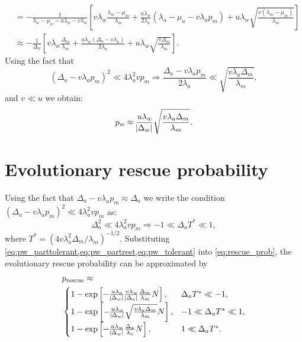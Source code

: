 \documentclass[12pt]{extarticle}
\newcommand{\presc}{p_\text{rescue}}
\begin{document}
\begin{appendices}
\begin{equation}
\begin{aligned}
&=-\frac{1}{\lambda_w-\mu_w-u\lambda_w-v\lambda_w}\left[v\lambda_w\frac{\lambda_m-\mu_m}{\lambda_m}+\frac{u\lambda_w}{2\lambda_a}\left(\lambda_a-\mu_a-v\lambda_ap_m\right)+u\lambda_w\sqrt{\frac{v\left(\lambda_m-\mu_m\right)}{\lambda_m}}\right]\\
&\approx-\frac{1}{\Delta_w}\left[v\lambda_w\frac{\Delta_m}{\lambda_m}+\frac{u\lambda_w\left(\Delta_a-v\lambda_a\right)}{2\lambda_a}+u\lambda_w\sqrt{\frac{v\Delta_m}{\lambda_m}}\right].
\end{aligned}
\end{equation}
Using the fact that
\begin{equation*}
\left(\Delta_a-v\lambda_ap_m\right)^2 \ll 4\lambda_a^2vp_m\Rightarrow\frac{\Delta_a-v\lambda_ap_m}{2\lambda_a} \ll \sqrt{\frac{v\lambda_a\Delta_m}{\lambda_m}},
\end{equation*}
and $v\ll u$ we obtain:
\begin{equation}\label{eq:pw_partrest}
p_w\approx\frac{u\lambda_w}{\abs{\Delta_w}} \sqrt{\frac{v\lambda_a\Delta_m}{\lambda_m}}.
\end{equation}

\section{Evolutionary rescue probability}\label{sec:appendix-rescue-prob}
Using the fact that $\Delta_a-v\lambda_ap_m\approx\Delta_a$ we write the condition $\left(\Delta_a-v\lambda_ap_m\right)^2 \ll 4\lambda_a^2vp_m$ as:
\begin{equation*}
\Delta_a^2 \ll 4\lambda_a^2vp_m\Rightarrow -1\ll\Delta_aT^*\ll1,
\end{equation*}
where $T^* = (4 v \lambda_a^2 \Delta_m/\lambda_m)^{-1/2}$.
Substituting \cref{eq:pw_parttolerant,eq:pw_partrest,eq:pw_tolerant} into \cref{eq:rescue_prob}, the evolutionary rescue probability can be approximated by
\begin{equation}\label{rescue_prob_approx}
\begin{aligned}
&\presc \approx \\
  &\begin{cases}
   1-\exp\left[-\frac{u\lambda_a}{\abs{\Delta_w}} \frac{v\lambda_w}{\abs{\Delta_a}} \frac{\Delta_m}{\lambda_m}  N\right] ,&
   \Delta_aT^*\ll-1 ,\\
   1-\exp\left[-\frac{u\lambda_w}{\abs{\Delta_w}} \sqrt{\frac{v\lambda_a\Delta_m}{\lambda_m}} N\right] ,&
  -1\ll\Delta_aT^*\ll1 ,\\
   1-\exp\left[-\frac{u\lambda_w}{\abs{\Delta_w}}  \frac{\Delta_a}{\lambda_a}  N\right] ,&
   1\ll\Delta_aT^*.
  \end{cases}
\end{aligned}
\end{equation}


\end{appendices}
\end{document}
